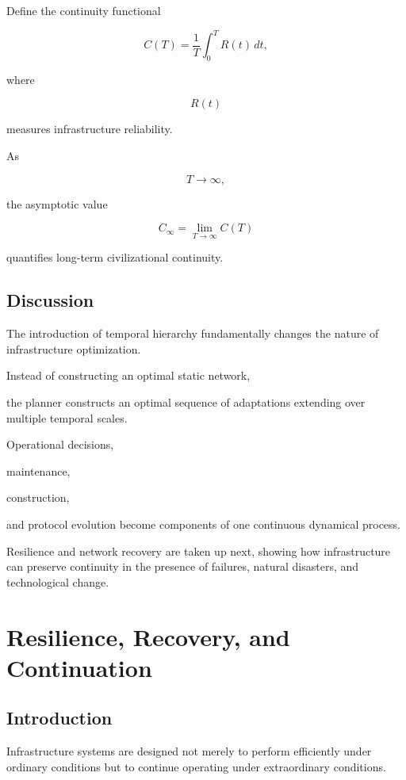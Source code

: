 \documentclass[11pt,fleqn]{book}
\numberwithin{equation}{chapter}
\theoremstyle{plain}
\theoremstyle{definition}
\theoremstyle{remark}
\begin{document}
Define the continuity functional

\[
C(T)
=
\frac1T
\int_0^T
R(t)\,dt,
\]

where

\[
R(t)
\]

measures infrastructure reliability.

As

\[
T
\rightarrow
\infty,
\]

the asymptotic value

\[
C_\infty
=
\lim_{T\rightarrow\infty}
C(T)
\]

quantifies long-term civilizational continuity.


\section{Discussion}

The introduction of temporal hierarchy fundamentally changes the nature
of infrastructure optimization.

Instead of constructing an optimal static network,

the planner constructs an optimal sequence of adaptations extending over
multiple temporal scales.

Operational decisions,

maintenance,

construction,

and protocol evolution become components of one continuous dynamical
process.

Resilience and network recovery are taken up next, showing how infrastructure can preserve continuity in
the presence of failures, natural disasters, and technological change.

\chapter{Resilience, Recovery, and Continuation}

\section{Introduction}

Infrastructure systems are designed not merely to perform efficiently
under ordinary conditions but to continue operating under extraordinary
conditions.
\end{document}
